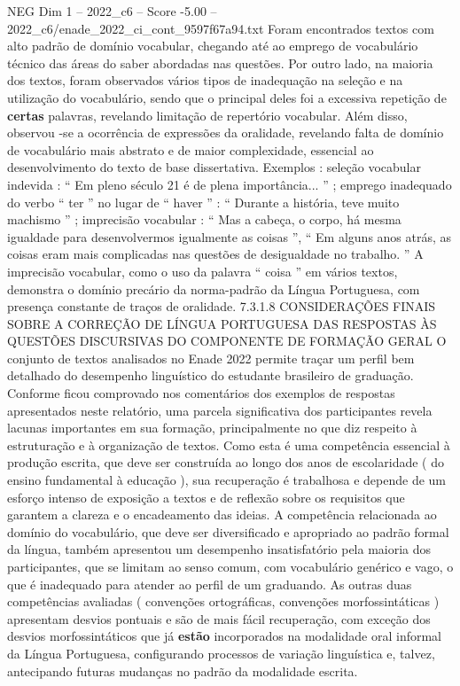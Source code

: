 \begin{textsample}{NEG Dim 1 – 2022\_c6 – Score -5.00 – 2022\_c6/enade\_2022\_ci\_cont\_9597f67a94.txt}
Foram encontrados textos com alto padrão de domínio vocabular, chegando até ao emprego de vocabulário técnico das áreas do saber abordadas nas questões.
Por outro lado, na maioria dos textos, foram observados vários tipos de inadequação na seleção e na utilização do vocabulário, sendo que o principal deles foi a excessiva repetição de \textbf{certas} palavras, revelando limitação de repertório vocabular.
Além disso, observou -se a ocorrência de expressões da oralidade, revelando falta de domínio de vocabulário mais abstrato e de maior complexidade, essencial ao desenvolvimento do texto de base dissertativa.
Exemplos : seleção vocabular indevida : “ Em pleno século 21 é de plena importância... ” ; emprego inadequado do verbo “ ter ” no lugar de “ haver ” : “ Durante a história, teve muito machismo ” ; imprecisão vocabular : “ Mas a cabeça, o corpo, há mesma igualdade para desenvolvermos igualmente as coisas ”, “ Em alguns anos atrás, as coisas eram mais complicadas nas questões de desigualdade no trabalho. ” A imprecisão vocabular, como o uso da palavra “ coisa ” em vários textos, demonstra o domínio precário da norma-padrão da Língua Portuguesa, com presença constante de traços de oralidade. 7.3.1.8 CONSIDERAÇÕES FINAIS SOBRE A CORREÇÃO DE LÍNGUA PORTUGUESA DAS RESPOSTAS ÀS QUESTÕES DISCURSIVAS DO COMPONENTE DE FORMAÇÃO GERAL O conjunto de textos analisados no Enade 2022 permite traçar um perfil bem detalhado do desempenho linguístico do estudante brasileiro de graduação.
Conforme ficou comprovado nos comentários dos exemplos de respostas apresentados neste relatório, uma parcela significativa dos participantes revela lacunas importantes em sua formação, principalmente no que diz respeito à estruturação e à organização de textos.
Como esta é uma competência essencial à produção escrita, que deve ser construída ao longo dos anos de escolaridade ( do ensino fundamental à educação ), sua recuperação é trabalhosa e depende de um esforço intenso de exposição a textos e de reflexão sobre os requisitos que garantem a clareza e o encadeamento das ideias.
A competência relacionada ao domínio do vocabulário, que deve ser diversificado e apropriado ao padrão formal da língua, também apresentou um desempenho insatisfatório pela maioria dos participantes, que se limitam ao senso comum, com vocabulário genérico e vago, o que é inadequado para atender ao perfil de um graduando.
As outras duas competências avaliadas ( convenções ortográficas, convenções morfossintáticas ) apresentam desvios pontuais e são de mais fácil recuperação, com exceção dos desvios morfossintáticos que já \textbf{estão} incorporados na modalidade oral informal da Língua Portuguesa, configurando processos de variação linguística e, talvez, antecipando futuras mudanças no padrão da modalidade escrita.

\end{textsample}
